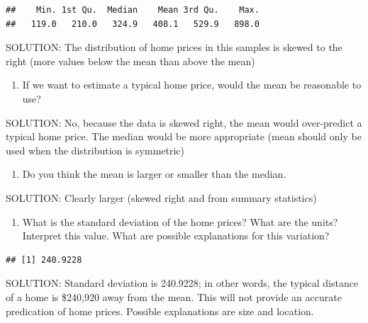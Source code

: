 \documentclass[]{article}
\newenvironment{Shaded}{\begin{snugshade}}{\end{snugshade}}
\newcommand{\KeywordTok}[1]{\textcolor[rgb]{0.13,0.29,0.53}{\textbf{#1}}}
\newcommand{\DecValTok}[1]{\textcolor[rgb]{0.00,0.00,0.81}{#1}}
\newcommand{\OperatorTok}[1]{\textcolor[rgb]{0.81,0.36,0.00}{\textbf{#1}}}
\newcommand{\NormalTok}[1]{#1}
\providecommand{\tightlist}{%
  \setlength{\itemsep}{0pt}\setlength{\parskip}{0pt}}
\begin{document}
\begin{verbatim}
##    Min. 1st Qu.  Median    Mean 3rd Qu.    Max. 
##   119.0   210.0   324.9   408.1   529.9   898.0
\end{verbatim}

SOLUTION: The distribution of home prices in this samples is skewed to
the right (more values below the mean than above the mean)

\begin{enumerate}
\def\labelenumi{\arabic{enumi}.}
\setcounter{enumi}{3}
\tightlist
\item
  If we want to estimate a typical home price, would the mean be
  reasonable to use?
\end{enumerate}

SOLUTION: No, because the data is skewed right, the mean would
over-predict a typical home price. The median would be more appropriate
(mean should only be used when the distribution is symmetric)

\begin{enumerate}
\def\labelenumi{\arabic{enumi}.}
\setcounter{enumi}{4}
\tightlist
\item
  Do you think the mean is larger or smaller than the median.
\end{enumerate}

SOLUTION: Clearly larger (skewed right and from summary statistics)

\begin{enumerate}
\def\labelenumi{\arabic{enumi}.}
\setcounter{enumi}{5}
\tightlist
\item
  What is the standard deviation of the home prices? What are the units?
  Interpret this value. What are possible explanations for this
  variation?
\end{enumerate}

\begin{Shaded}
\end{Shaded}

\begin{verbatim}
## [1] 240.9228
\end{verbatim}

SOLUTION: Standard deviation is 240.9228; in other words, the typical
distance of a home is \$240,920 away from the mean. This will not
provide an accurate predication of home prices. Possible explanations
are size and location.
\end{document}

